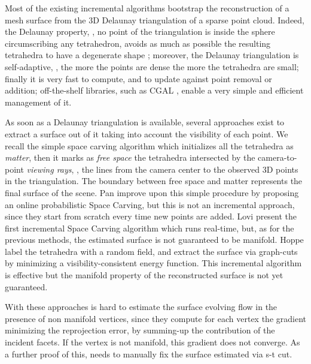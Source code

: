 Most of the existing incremental algorithms \cite{lovi_et_al_11,Pan_et_al09,litvinov_lhuillier_13,litvinov_Lhiuller14} bootstrap the reconstruction of a mesh surface from the 3D Delaunay triangulation of a sparse point cloud. Indeed, the Delaunay property, \ie, no point of the triangulation is inside the sphere circumscribing any tetrahedron, avoids as much as possible the resulting tetrahedra to have a degenerate shape \cite{Maur_02}; moreover, the Delaunay triangulation  is self-adaptive, \ie, the more the points are dense the more the tetrahedra are small; finally it is very fast to compute, and to  update against point removal or addition; off-the-shelf libraries, such as CGAL \cite{cgal}, enable a very simple and efficient management of it. 

As soon as a Delaunay triangulation is available, several approaches exist to extract a surface out of it taking into account the visibility of each point. 
We recall the simple space carving algorithm \cite{kutulakos_seitz05} which initializes all the tetrahedra as \emph{matter}, then it marks as \emph{free space} the tetrahedra intersected by the camera-to-point \emph{viewing rays}, \ie, the lines from the camera center to the observed 3D points in the triangulation. 
The boundary between free space and matter represents the final surface of the scene.
Pan \etal \cite{Pan_et_al09} improve upon this simple procedure by proposing an online probabilistic Space Carving, but this is not an incremental approach, since they start from scratch every time new points are added.
Lovi \etal \cite{lovi_et_al_11} present the first incremental Space Carving algorithm which runs real-time, but, as for the previous methods, the estimated surface is not guaranteed to be manifold.
 Hoppe \etal \cite{Hoppe13} label the tetrahedra with a random field, and extract the surface via graph-cuts by minimizing a visibility-consistent energy function. This incremental algorithm is effective but the manifold property of the reconstructed surface is not yet guaranteed.


With these approaches is hard to estimate the surface evolving flow in the presence of non manifold vertices, since they compute for each vertex the gradient minimizing the reprojection error, by summing-up the contribution of the incident facets. If the vertex is not manifold, this gradient does not converge. As a further proof of this, \cite{vu_et_al_2012} needs to manually fix the surface estimated via s-t cut.

